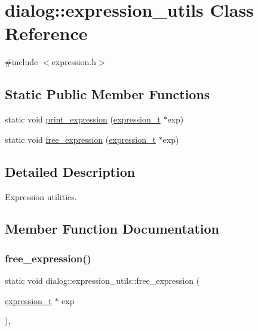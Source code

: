 \hypertarget{classdialog_1_1expression__utils}{}\section{dialog\+:\+:expression\+\_\+utils Class Reference}
\label{classdialog_1_1expression__utils}


{\ttfamily \#include $<$expression.\+h$>$}

\subsection*{Static Public Member Functions}
\begin{DoxyCompactItemize}
\item 
static void \hyperlink{classdialog_1_1expression__utils_ab26b15dece4bf0ab5f0879d397b15ad1}{print\+\_\+expression} (\hyperlink{structdialog_1_1expression__t}{expression\+\_\+t} $\ast$exp)
\item 
static void \hyperlink{classdialog_1_1expression__utils_aa077b3345553c3c71674c2577eebf143}{free\+\_\+expression} (\hyperlink{structdialog_1_1expression__t}{expression\+\_\+t} $\ast$exp)
\end{DoxyCompactItemize}


\subsection{Detailed Description}
Expression utilities. 

\subsection{Member Function Documentation}
\mbox{\label{classdialog_1_1expression__utils_aa077b3345553c3c71674c2577eebf143}} 
\subsubsection{\texorpdfstring{free\+\_\+expression()}{free\_expression()}}
{\footnotesize\ttfamily static void dialog\+::expression\+\_\+utils\+::free\+\_\+expression (\begin{DoxyParamCaption}\item[{\hyperlink{structdialog_1_1expression__t}{expression\+\_\+t} $\ast$}]{exp }\end{DoxyParamCaption})\hspace{0.3cm}{\ttfamily [inline]}, {\ttfamily [static]}}


